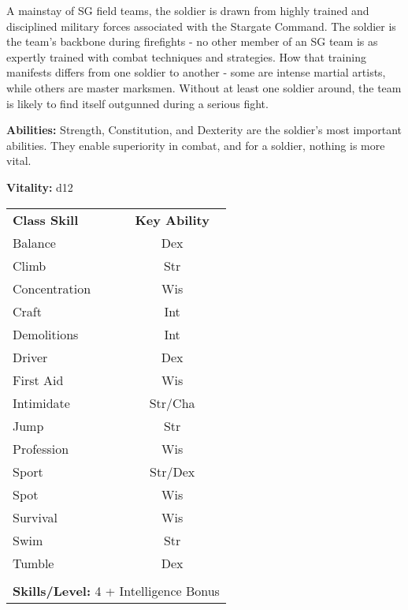 \begin{multicols}{2}

A mainstay of SG field teams, the soldier is drawn from highly trained and disciplined military forces associated with the Stargate Command. The soldier is the team's backbone during firefights - no other member of an SG team is as expertly trained with combat techniques and strategies. How that training manifests differs from one soldier to another - some are intense martial artists, while others are master marksmen. Without at least one soldier around, the team is likely to find itself outgunned during a serious fight.

\textbf{Abilities:} Strength, Constitution, and Dexterity are the soldier's most important abilities. They enable superiority in combat, and for a soldier, nothing is more vital.

\textbf{Vitality:} d12

\end{multicols}

\begin{table}[htb]
\raggedright
\begin{tabular}{l c}
\textbf{Class Skill} & \textbf{Key Ability}\\

Balance & Dex\\
Climb & Str\\
Concentration & Wis\\
Craft & Int\\
Demolitions & Int\\
Driver & Dex\\
First Aid & Wis\\
Intimidate & Str/Cha\\
Jump & Str\\
Profession & Wis\\
Sport & Str/Dex\\
Spot & Wis\\
Survival & Wis\\
Swim & Str\\
Tumble & Dex\\

\multicolumn{2}{l}{\cellcolor{white}}\\
\multicolumn{2}{l}{\cellcolor{white}\textbf{Skills/Level:} 4 + Intelligence Bonus}\\
\end{tabular}
\end{table}

